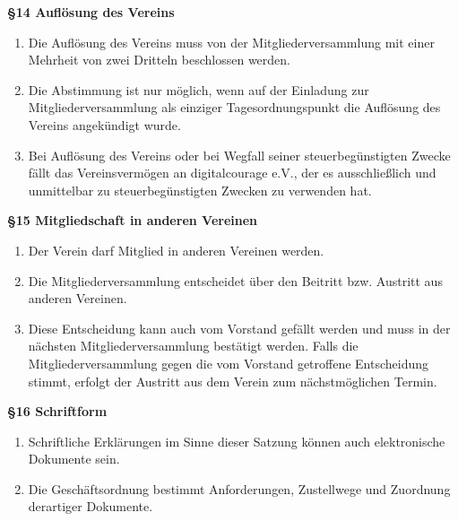 \documentclass[a4paper,
               12pt,
               titlepage,
               parskip=half]{scrartcl}
\begin{document}
\textbf{§14 Auflösung des Vereins}
{\small
	\begin{enumerate}
		\item Die Auflösung des Vereins muss von der Mitgliederversammlung mit einer Mehrheit von zwei Dritteln beschlossen werden.
		\item Die Abstimmung ist nur möglich, wenn auf der Einladung zur Mitgliederversammlung als einziger Tagesordnungspunkt die Auflösung des Vereins angekündigt wurde.
		\item Bei Auflösung des Vereins oder bei Wegfall seiner steuerbegünstigten Zwecke fällt das Vereinsvermögen an digitalcourage e.V., der es ausschließlich und unmittelbar zu steuerbegünstigten Zwecken zu verwenden hat.
	\end{enumerate}
}

\newpage

\textbf{§15 Mitgliedschaft in anderen Vereinen}
{\small
	\begin{enumerate}
		\item Der Verein darf Mitglied in anderen Vereinen werden.
		\item Die Mitgliederversammlung entscheidet über den Beitritt bzw. Austritt aus anderen Vereinen.
		\item Diese Entscheidung kann auch vom Vorstand gefällt werden und muss in der nächsten Mitgliederversammlung bestätigt werden. Falls die Mitgliederversammlung gegen die vom Vorstand getroffene Entscheidung stimmt, erfolgt der Austritt aus dem Verein zum nächstmöglichen Termin.
	\end{enumerate}
}

\vspace{1.0em}

\textbf{§16 Schriftform}
{\small
	\begin{enumerate}
		\item Schriftliche Erklärungen im Sinne dieser Satzung können auch elektronische Dokumente sein.
		\item Die Geschäftsordnung bestimmt Anforderungen, Zustellwege und Zuordnung derartiger Dokumente.
	\end{enumerate}
}
\end{document}
